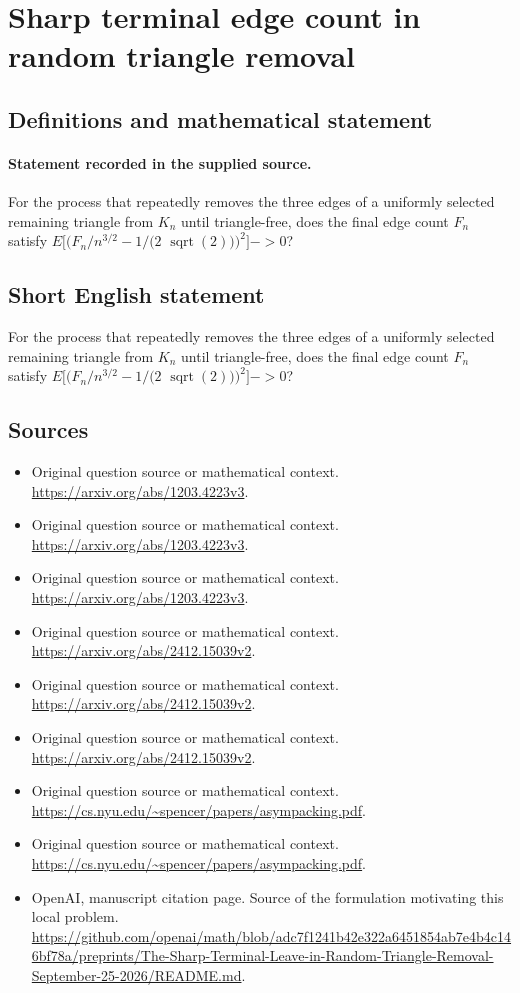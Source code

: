 \documentclass[11pt]{article}
\begin{document}
\section*{Sharp terminal edge count in random triangle removal}\label{30007106}
\subsection{Definitions and mathematical statement}
\paragraph{Statement recorded in the supplied source.}
For the process that repeatedly removes the three edges of a uniformly selected remaining triangle from $K_n$ until triangle-free, does the final edge count $F_n$ satisfy $E[(F_n/n^{3/2}-1/(2$ $\operatorname{sqrt}(2)))^2]->0$?
\subsection{Short English statement}
For the process that repeatedly removes the three edges of a uniformly selected remaining triangle from $K_n$ until triangle-free, does the final edge count $F_n$ satisfy $E[(F_n/n^{3/2}-1/(2$ $\operatorname{sqrt}(2)))^2]->0$?
\subsection{Sources}
\begin{itemize}
\item[S1] Original question source or mathematical context.
\url{https://arxiv.org/abs/1203.4223v3}.
\item[S2] Original question source or mathematical context.
\url{https://arxiv.org/abs/1203.4223v3}.
\item[S3] Original question source or mathematical context.
\url{https://arxiv.org/abs/1203.4223v3}.
\item[S4] Original question source or mathematical context.
\url{https://arxiv.org/abs/2412.15039v2}.
\item[S5] Original question source or mathematical context.
\url{https://arxiv.org/abs/2412.15039v2}.
\item[S6] Original question source or mathematical context.
\url{https://arxiv.org/abs/2412.15039v2}.
\item[S7] Original question source or mathematical context.
\url{https://cs.nyu.edu/~spencer/papers/asympacking.pdf}.
\item[S8] Original question source or mathematical context.
\url{https://cs.nyu.edu/~spencer/papers/asympacking.pdf}.
\item[S9] OpenAI, manuscript citation page. Source of the formulation motivating this local problem.
\url{https://github.com/openai/math/blob/adc7f1241b42e322a6451854ab7e4b4c146bf78a/preprints/The-Sharp-Terminal-Leave-in-Random-Triangle-Removal-September-25-2026/README.md}.
\end{itemize}
\end{document}

